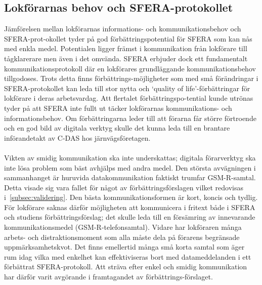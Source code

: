 \subsection{Lokförarnas behov och SFERA-protokollet}
Jämförelsen mellan lokförarnas informations- och kommunikationsbehov och SFERA-prot-okollet tyder på god förbättringspotential för SFERA som kan nås med enkla medel.
Potentialen ligger främst i kommunikation från lokförare till tågklarerare men även i det omvända.
SFERA erbjuder dock ett fundamentalt kommunikationsprotokoll där en lokförares grundläggande kommunikationsbehov tillgodoses.
Trots detta finns förbättrings-möjligheter som med små förändringar i SFERA-protokollet kan leda till stor nytta och \lq{}quality of life\rq{}-förbättringar för lokförare i deras arbetsvardag.
Att flertalet förbättringspo-tential kunde utrönas tyder på att SFERA inte fullt ut täcker lokförarnas kommunikations- och informationsbehov.
Om förbättringarna leder till att förarna får större förtroende och en god bild av digitala verktyg skulle det kunna leda till en brantare införandetakt av C-DAS hos järnvägsföretagen.
\paragraph{}
\hspace{-12pt}
Vikten av smidig kommunikation ska inte underskattas; digitala förarverktyg ska inte lösa problem som bäst avhjälps med andra medel.
Den största avvägningen i sammanhanget är huruvida datakommunikation faktiskt trumfar GSM-R-samtal.
Detta visade sig vara fallet för något av förbättringsförslagen vilket redovisas i~\ref{subsec:validering}.
Den bästa kommunikationsformen är kort, koncis och tydlig.
För lokförare saknas därför möjligheten att kommunicera i fritext både i SFERA och studiens förbättringsförslag; det skulle leda till en försämring av innevarande kommunikationsmedel (GSM-R-telefonsamtal).
Vidare har lokföraren många arbets- och distraktionsmoment som alla måste dela på förarens begränsade uppmärksamhetskvot.
Det finns emellertid många små korta samtal som äger rum idag vilka med enkelhet kan effektiviseras bort med datameddelanden i ett förbättrat SFERA-protokoll.
Att sträva efter enkel och smidig kommunikation har därför varit avgörande i framtagandet av förbättrings-förslaget.